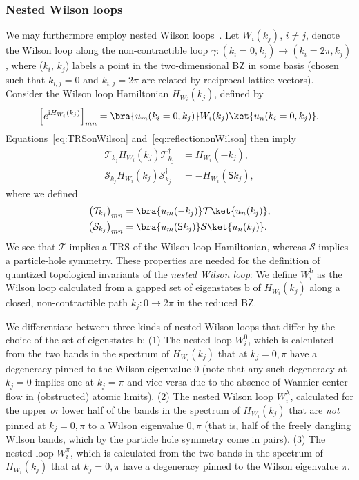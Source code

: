 \subsubsection{Nested Wilson loops}
We may furthermore employ nested Wilson loops~\cite{BABHughesBenalcazar17,Benalcazar17}. Let $W_i (k_j)$, $i \neq j$, denote the Wilson loop along the non-contractible loop $\gamma: (k_i = 0, k_j) \rightarrow (k_i = 2\pi, k_j)$, where ($k_i$, $k_j$) labels a point in the two-dimensional BZ in some basis (chosen such that $k_{i,j} = 0$ and $k_{i,j} = 2\pi$ are related by reciprocal lattice vectors). Consider the Wilson loop Hamiltonian $H_{W_i} (k_j)$, defined by
\begin{equation}
\left[e^{\mathrm{i} H_{W_i}(k_j)} \right]_{mn}= \bra{u_m(k_i=0,k_j)} W_i (k_j) \ket{u_n(k_i=0,k_j)}.
\end{equation}
Equations~\eqref{eq:TRSonWilson} and~\eqref{eq:reflectiononWilson} then imply
\begin{equation}
\begin{aligned}
\mathcal{T}_{k_j} H_{W_i} (k_j) \mathcal{T}_{k_j}^\dagger &= H_{W_i} (-k_j), \\
\mathcal{S}_{k_j} H_{W_i} (k_j) \mathcal{S}_{k_j}^\dagger &= - H_{W_i} (\mathsf{S} k_j),
\end{aligned}
\label{eq:nestedWilsonprops}
\end{equation}
where we defined
\begin{equation}
\begin{aligned}
\left(\mathcal{T}_{k_j} \right)_{mn} &= \bra{u_m(-k_j)} \mathcal{T} \ket{u_n(k_j)}, \\
\left(\mathcal{S}_{k_j} \right)_{mn} &= \bra{u_m(\mathsf{S}k_j)} \mathcal{S} \ket{u_n(k_j)}.
\end{aligned}
\end{equation}
We see that $\mathcal{T}$ implies a TRS of the Wilson loop Hamiltonian, whereas $\mathcal{S}$ implies a particle-hole symmetry. These properties are needed for the definition of quantized topological invariants of the \emph{nested Wilson loop}: We define $W_i^\mathrm{b}$ as the Wilson loop calculated from a gapped set of eigenstates $\mathrm{b}$ of $H_{W_i} (k_j)$ along a closed, non-contractible path $k_j: 0 \rightarrow 2\pi$ in the reduced BZ.

We differentiate between three kinds of nested Wilson loops that differ by the choice of the set of eigenstates $\mathrm{b}$: (1) The nested loop $W_i^0$, which is calculated from the two bands in the spectrum of $H_{W_i} (k_j)$ that at $k_j = 0, \pi$ have a degeneracy pinned to the Wilson eigenvalue $0$ (note that any such degeneracy at $k_j = 0$ implies one at $k_j = \pi$ and vice versa due to the absence of Wannier center flow in (obstructed) atomic limits). (2) The nested Wilson loop $W_i^{\lambda}$, calculated for the upper \emph{or} lower half of the bands in the spectrum of $H_{W_i} (k_j)$ that are \emph{not} pinned at $k_j = 0, \pi$ to a Wilson eigenvalue $0,\pi$ (that is, half of the freely dangling Wilson bands, which by the particle hole symmetry come in pairs). (3) The nested loop $W_i^{\pi}$, which is calculated from the two bands in the spectrum of $H_{W_i} (k_j)$ that at $k_j = 0, \pi$ have a degeneracy pinned to the Wilson eigenvalue $\pi$.

